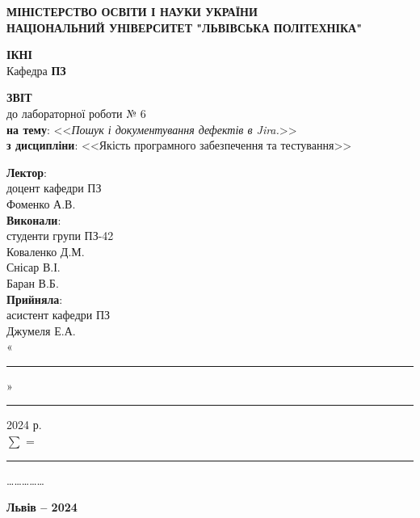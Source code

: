 \documentclass[oneside,14pt]{extarticle}
\newcommand\subject{Якість програмного забезпечення та тестування}
\newcommand\lecturer{доцент кафедри ПЗ\\Фоменко А.В.}
\newcommand\teacher{асистент кафедри ПЗ\\Джумеля Е.А.}
\newcommand\mygroup{ПЗ-42}
\newcommand\lab{6}
\newcommand\theme{Пошук і документування дефектів в Jira.}
\begin{document}
\begin{normalsize}
	\begin{titlepage}
		\thispagestyle{empty}
		\begin{center}
			\textbf{МІНІСТЕРСТВО ОСВІТИ І НАУКИ УКРАЇНИ\\
				НАЦІОНАЛЬНИЙ УНІВЕРСИТЕТ "ЛЬВІВСЬКА ПОЛІТЕХНІКА"}
		\end{center}
		\begin{flushright}
			\textbf{ІКНІ}\\
			Кафедра \textbf{ПЗ}
		\end{flushright}
		\vspace{80pt}
		\begin{center}
			\textbf{ЗВІТ}\\
			\vspace{10pt}
			до лабораторної роботи № \lab\\
			\textbf{на тему}: <<\textit{\theme}>>\\
			\textbf{з дисципліни}: <<\subject>>
		\end{center}
		\vspace{80pt}
		\begin{flushright}
			
			\textbf{Лектор}:\\
			\lecturer\\
			\vspace{28pt}
			\textbf{Виконали}:\\
			
			студенти групи \mygroup\\
			Коваленко Д.М.\\
			Снісар В.І.\\
			Баран В.Б.\\
			\vspace{28pt}
			\textbf{Прийняла}:\\
			
			\teacher\\
			
			\vspace{28pt}
			«\rule{1cm}{0.15mm}» \rule{1.5cm}{0.15mm} 2024 р.\\
			$\sum$ = \rule{1cm}{0.15mm}……………\\
			
		\end{flushright}
		\vspace{\fill}
		\begin{center}
			\textbf{Львів – 2024}
		\end{center}
	\end{titlepage}
		

\end{normalsize}
\end{document}
